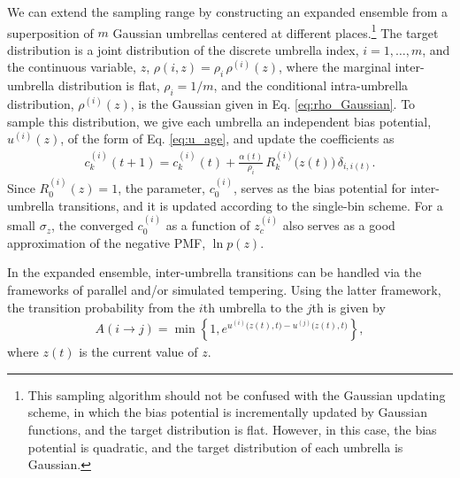 \documentclass[reprint, superscriptaddress, floatfix]{revtex4-1}
\begin{document}
We can extend the sampling range
by constructing an expanded ensemble
from a superposition of $m$ Gaussian umbrellas
centered at different places.\footnote{This sampling
  algorithm should not be confused with the Gaussian updating scheme,
  in which the bias potential is incrementally updated by Gaussian functions,
  and the target distribution is flat.
  However, in this case, the bias potential is quadratic,
  and the target distribution of each umbrella is Gaussian.}
%
The target distribution is a joint distribution
of the discrete umbrella index, $i = 1, \dots, m$,
and the continuous variable, $z$,
$\rho(i, z) = \rho_i \, \rho^{(i)}(z)$,
where the marginal inter-umbrella distribution is flat,
$\rho_i = 1/m$,
and the conditional intra-umbrella distribution, $\rho^{(i)}(z)$,
is the Gaussian given in Eq. \eqref{eq:rho_Gaussian}. %
%
To sample this distribution, we give each umbrella
an independent bias potential, $u^{(i)}(z)$,
of the form of Eq. \eqref{eq:u_age},
and update the coefficients as
\begin{align*}
  c_k^{(i)}(t+1) = c_k^{(i)}(t)
  + \frac{ \alpha(t) } { \rho_i } \, R_k^{(i)}\bigl( z(t) \bigr) \, \delta_{i, i(t)}
  .
\end{align*}
%
%
Since $R_0^{(i)}(z) = 1$,
the parameter, $c_0^{(i)}$,
serves as the bias potential
for inter-umbrella transitions,
and it is updated according to the single-bin scheme\cite{li2007}.
%
For a small $\sigma_z$, the converged
$c_0^{(i)}$ as a function of $z_c^{(i)}$
also serves as a good approximation of
the negative PMF, $\ln p(z)$.\cite{maragliano2006, *abrams2008}

In the expanded ensemble,
inter-umbrella transitions can be handled via the frameworks of
parallel\cite{swendsen1986,
  *geyer1991, *hukushima1996, *hansmann1997, *sugita1999,
  *earl2005, *zuckerman2011, *rauscher2009,
  neuhaus2006, *neuhaus2007, kim2010}
and/or simulated tempering\cite{marinari1992,
  *lyubartsev1992, li2007,
  park2007, *nguyen2013, *zhang2015st}.
%
Using the latter framework,
the transition probability from
the $i$th umbrella to the $j$th is given by
%
\begin{align}
A(i\to j) =
\min\left\{1,
  e^{
    u^{(i)}\bigl( z(t), t \bigr)
    - u^{(j)}\bigl( z(t), t \bigr)
    }
  \right\}
  ,
  \label{eq:transprob_st}
\end{align}
where $z(t)$ is the current value of $z$.
%
%
\end{document}
